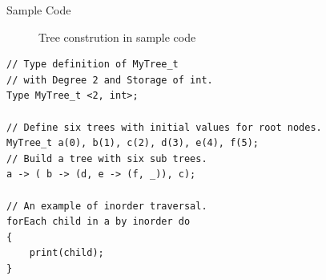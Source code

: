 \documentclass[aps,letterpaper,10pt]{revtex4}
\makeatletter
\renewcommand{\section}{\@startsection{section}{1}{0mm}
  {-\baselineskip}{0.5\baselineskip}{\bf\leftline}}
\makeatother
\begin{document}
\section{Sample Code}

\begin{figure}[ht]
{\centering {} \par}
\caption{Tree constrution in sample code}
\label{tree}
\end{figure}

\begin{lstlisting}
// Type definition of MyTree_t
// with Degree 2 and Storage of int.
Type MyTree_t <2, int>;

// Define six trees with initial values for root nodes.
MyTree_t a(0), b(1), c(2), d(3), e(4), f(5);
// Build a tree with six sub trees.
a -> ( b -> (d, e -> (f, _)), c);

// An example of inorder traversal.
forEach child in a by inorder do
{
	print(child);
}
\end{lstlisting}
\end{document}
